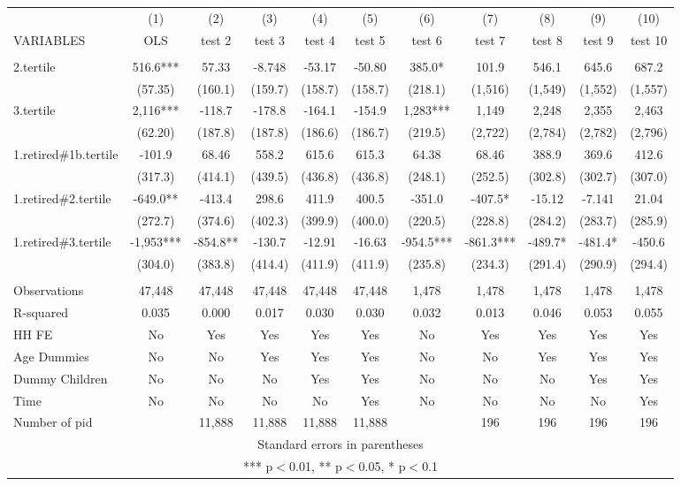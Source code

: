 \begin{tabular}{lcccccccccc} \hline
 & (1) & (2) & (3) & (4) & (5) & (6) & (7) & (8) & (9) & (10) \\
VARIABLES & OLS & test 2 & test 3 & test 4 & test 5 & test 6 & test 7 & test 8 & test 9 & test 10 \\ \hline
 &  &  &  &  &  &  &  &  &  &  \\
2.tertile & 516.6*** & 57.33 & -8.748 & -53.17 & -50.80 & 385.0* & 101.9 & 546.1 & 645.6 & 687.2 \\
 & (57.35) & (160.1) & (159.7) & (158.7) & (158.7) & (218.1) & (1,516) & (1,549) & (1,552) & (1,557) \\
3.tertile & 2,116*** & -118.7 & -178.8 & -164.1 & -154.9 & 1,283*** & 1,149 & 2,248 & 2,355 & 2,463 \\
 & (62.20) & (187.8) & (187.8) & (186.6) & (186.7) & (219.5) & (2,722) & (2,784) & (2,782) & (2,796) \\
1.retired\#1b.tertile & -101.9 & 68.46 & 558.2 & 615.6 & 615.3 & 64.38 & 68.46 & 388.9 & 369.6 & 412.6 \\
 & (317.3) & (414.1) & (439.5) & (436.8) & (436.8) & (248.1) & (252.5) & (302.8) & (302.7) & (307.0) \\
1.retired\#2.tertile & -649.0** & -413.4 & 298.6 & 411.9 & 400.5 & -351.0 & -407.5* & -15.12 & -7.141 & 21.04 \\
 & (272.7) & (374.6) & (402.3) & (399.9) & (400.0) & (220.5) & (228.8) & (284.2) & (283.7) & (285.9) \\
1.retired\#3.tertile & -1,953*** & -854.8** & -130.7 & -12.91 & -16.63 & -954.5*** & -861.3*** & -489.7* & -481.4* & -450.6 \\
 & (304.0) & (383.8) & (414.4) & (411.9) & (411.9) & (235.8) & (234.3) & (291.4) & (290.9) & (294.4) \\
 &  &  &  &  &  &  &  &  &  &  \\
Observations & 47,448 & 47,448 & 47,448 & 47,448 & 47,448 & 1,478 & 1,478 & 1,478 & 1,478 & 1,478 \\
R-squared & 0.035 & 0.000 & 0.017 & 0.030 & 0.030 & 0.032 & 0.013 & 0.046 & 0.053 & 0.055 \\
HH FE & No & Yes & Yes & Yes & Yes & No & Yes & Yes & Yes & Yes \\
Age Dummies & No & No & Yes & Yes & Yes & No & No & Yes & Yes & Yes \\
Dummy Children & No & No & No & Yes & Yes & No & No & No & Yes & Yes \\
Time & No & No & No & No & Yes & No & No & No & No & Yes \\
 Number of pid &  & 11,888 & 11,888 & 11,888 & 11,888 &  & 196 & 196 & 196 & 196 \\ \hline
\multicolumn{11}{c}{ Standard errors in parentheses} \\
\multicolumn{11}{c}{ *** p$<$0.01, ** p$<$0.05, * p$<$0.1} \\
\end{tabular}
